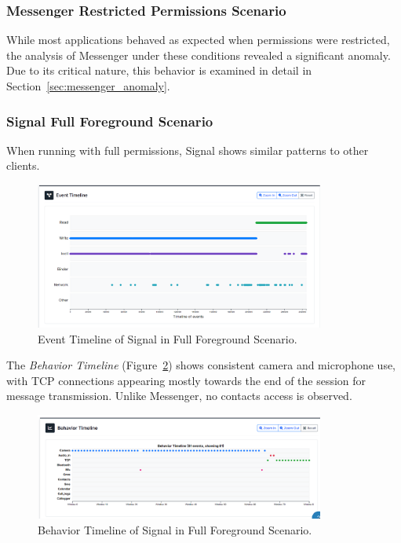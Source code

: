\documentclass[a4paper,12pt]{report}
\begin{document}
\subsubsection{Messenger Restricted Permissions Scenario}
While most applications behaved as expected when permissions were restricted, the analysis of Messenger under these conditions revealed a significant anomaly. Due to its critical nature, this behavior is examined in detail in Section~\ref{sec:messenger_anomaly}.

\subsubsection{Signal Full Foreground Scenario}

When running with full permissions, Signal shows similar patterns to other clients.

\begin{figure}[H]
    \centering
    \includegraphics[width=0.85\textwidth]{signal-full-events.png}
    \caption{Event Timeline of Signal in Full Foreground Scenario.}
    \label{fig:signal-full-events}
\end{figure}

The \textit{Behavior Timeline} (Figure~\ref{fig:signal-full-behav}) shows consistent camera and microphone use, with TCP connections appearing mostly towards the end of the session for message transmission. Unlike Messenger, no contacts access is observed.

\begin{figure}[H]
    \centering
    \includegraphics[width=0.85\textwidth]{signal-full-behav.png}
    \caption{Behavior Timeline of Signal in Full Foreground Scenario.}
    \label{fig:signal-full-behav}
\end{figure}
\end{document}
